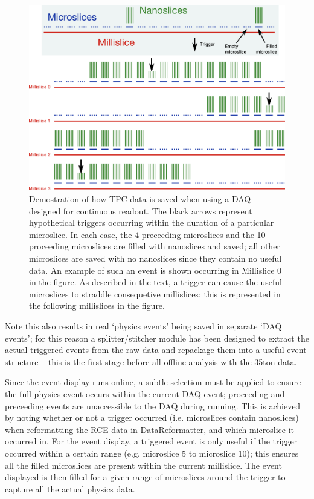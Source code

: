 \begin{figure}[ht]
  \centering
  \includegraphics[width=16cm]{triggered_event.png}
  \caption{Demostration of how TPC data is saved when using a DAQ designed for continuous readout.  The black arrows represent hypothetical triggers occurring within the duration of a particular microslice.  In each case, the 4 preceeding microslices and the 10 proceeding microslices are filled with nanoslices and saved; all other microslices are saved with no nanoslices since they contain no useful data.  An example of such an event is shown occurring in Millislice 0 in the figure.  As described in the text, a trigger can cause the useful microslices to straddle consequetive millislices; this is represented in the following millislices in the figure.}
  \label{fig:TriggeredEvent}
\end{figure}
Note this also results in real `physics events' being saved in separate `DAQ events'; for this reason a splitter/stitcher module has been designed to extract the actual triggered events from the raw data and repackage them into a useful event structure -- this is the first stage before all offline analysis with the 35ton data.

Since the event display runs online, a subtle selection must be applied to ensure the full physics event occurs within the current DAQ event; proceeding and preceeding events are unaccessible to the DAQ during running.  This is achieved by noting whether or not a trigger occurred (i.e. microslices contain nanoslices) when reformatting the RCE data in DataReformatter, and which microslice it occurred in.  For the event display, a triggered event is only useful if the trigger occurred within a certain range (e.g. microslice 5 to microslice 10); this ensures all the filled microslices are present within the current millislice.  The event displayed is then filled for a given range of microslices around the trigger to capture all the actual physics data.

